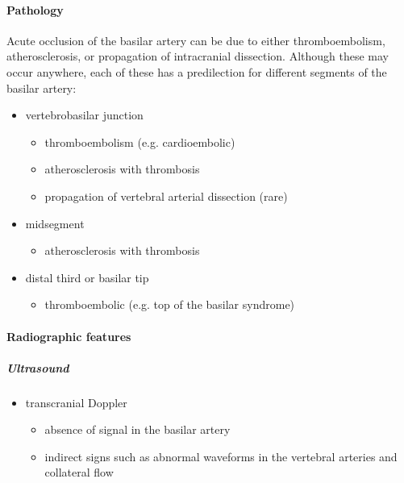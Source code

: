 \paragraph{Pathology}

Acute occlusion of the basilar artery can be due to either thromboembolism, atherosclerosis, or propagation of intracranial dissection. Although these may occur anywhere, each of these has a predilection for different segments of the basilar artery:

\begin{itemize}
	\item
	vertebrobasilar junction
	
	\begin{itemize}
		\item
		thromboembolism (e.g. cardioembolic)
		\item
		atherosclerosis with thrombosis
		\item
		propagation of vertebral arterial dissection (rare)
	\end{itemize}
	\item
	midsegment
	
	\begin{itemize}
		\item
		atherosclerosis with thrombosis
	\end{itemize}
	\item
	distal third or basilar tip
	
	\begin{itemize}
		\item
		thromboembolic (e.g. top of the basilar syndrome)
	\end{itemize}
\end{itemize}

\paragraph{Radiographic features}


\subparagraph{Ultrasound}

\begin{itemize}
	\item
	transcranial Doppler
	
	\begin{itemize}
		\item
		absence of signal in the basilar artery
		\item
		indirect signs such as abnormal waveforms in the vertebral arteries and collateral flow
	\end{itemize}
\end{itemize}


